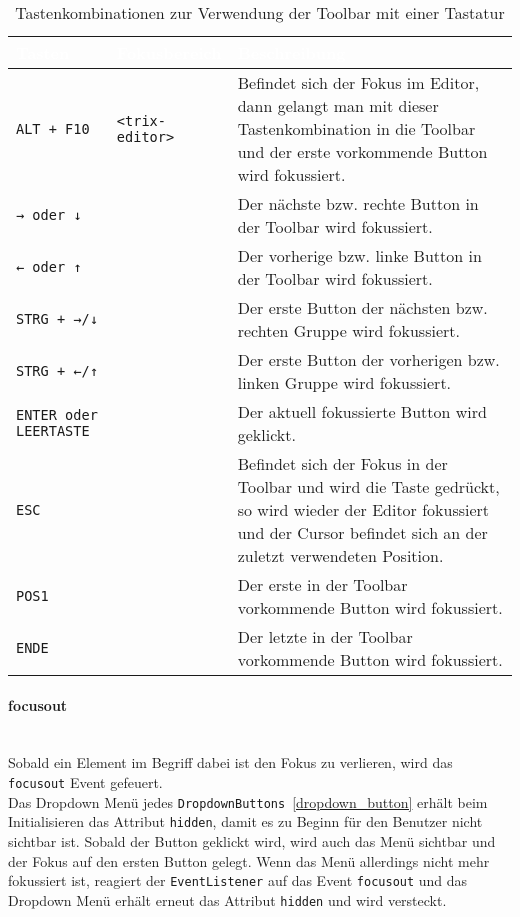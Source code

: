 \begin{table}[H]
	\begin{center}
	\begin{tabularx}{\textwidth}{| p{2.5cm} | l | X |}
		\hline
		\cellcolor{Gray}\textcolor{White}{Tasten} & \cellcolor{Gray}\textcolor{White}{Fokusbereich} & \cellcolor{Gray}\textcolor{White}{Beschreibung} \\
		\hline
		\texttt{ALT + F10} & \texttt{<trix-editor>} & Befindet sich der Fokus im Editor, dann gelangt man mit dieser Tastenkombination in die Toolbar
		und der erste vorkommende Button wird fokussiert.\\
		\hline
		\texttt{→ oder ↓} & \texttt{} & Der nächste bzw. rechte Button in der Toolbar wird fokussiert.\\
		\hline
		\texttt{← oder ↑} & \texttt{} & Der vorherige bzw. linke Button in der Toolbar wird fokussiert.\\
		\hline
		\texttt{STRG + →/↓} & \texttt{} & Der erste Button der nächsten bzw. rechten Gruppe wird fokussiert.\\
		\hline
		\texttt{STRG + ←/↑} & \texttt{} & Der erste Button der vorherigen bzw. linken Gruppe wird fokussiert.\\
		\hline
		\texttt{ENTER oder LEERTASTE} & \texttt{} & Der aktuell fokussierte Button wird geklickt.\\
		\hline
		\texttt{ESC} & \texttt{} & Befindet sich der Fokus in der Toolbar und wird die Taste gedrückt, so wird wieder der Editor fokussiert
		und der Cursor befindet sich an der zuletzt verwendeten Position.\\
		\hline
		\texttt{POS1} & \texttt{} & Der erste in der Toolbar vorkommende Button wird fokussiert.\\
		\hline
		\texttt{ENDE} & \texttt{} & Der letzte in der Toolbar vorkommende Button wird fokussiert.\\
		\hline
	\end{tabularx}
	\end{center}
	\caption{Tastenkombinationen zur Verwendung der Toolbar mit einer Tastatur}
\end{table}

\paragraph{focusout}\mbox{}\\
Sobald ein Element im Begriff dabei ist den Fokus zu verlieren, wird das \texttt{focusout} Event gefeuert.\\
Das Dropdown Menü jedes \texttt{DropdownButtons}~\ref{dropdown_button} erhält beim Initialisieren das Attribut \texttt{hidden}, damit es zu Beginn für den Benutzer nicht sichtbar ist. Sobald der Button geklickt wird, wird auch das Menü sichtbar und der Fokus auf den ersten Button gelegt. Wenn das Menü allerdings nicht mehr fokussiert ist, reagiert der \texttt{EventListener} auf das Event \texttt{focusout} und das Dropdown Menü erhält erneut das Attribut \texttt{hidden} und wird versteckt.

